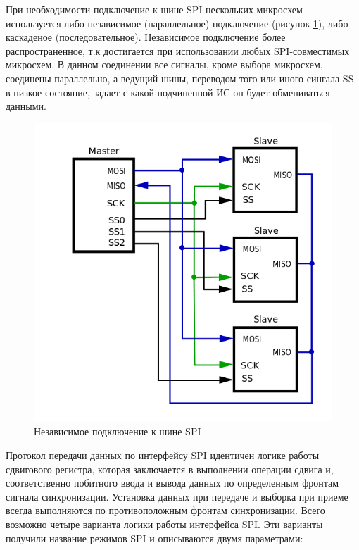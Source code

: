 При необходимости подключение к шине SPI нескольких микросхем используется либо независимое (параллельное) подключение (рисунок \ref{fig:spiindep}), либо каскаденое (последовательное). Независимое подключение более распространенное, т.к достигается при использовании любых SPI-совместимых микросхем. В данном соединении все сигналы, кроме выбора микросхем, соединены параллельно, а ведущий шины, переводом того или иного сингала SS в низкое состояние, задает с какой подчиненной ИС он будет обмениваться данными.

\begin{figure}[H]
	\centering
		\includegraphics[scale=0.5]{img/spiindependent.png}
	\caption{Независимое подключение к шине SPI \label{fig:spiindep}}
\end{figure}


Протокол передачи данных по интерфейсу SPI идентичен логике работы сдвигового регистра, которая заключается в выполнении операции сдвига и, соответственно побитного ввода и вывода данных по определенным фронтам сигнала синхронизации. Установка данных при передаче и выборка при приеме всегда выполняются по противоположным фронтам синхронизации. Всего возможно четыре варианта логики работы интерфейса SPI. Эти варианты получили название режимов SPI и описываются двумя параметрами:

